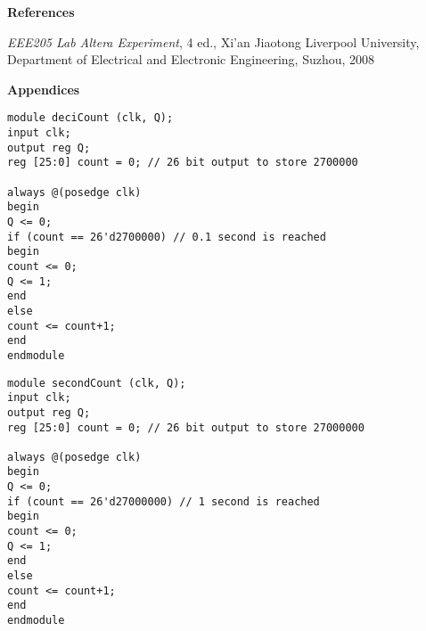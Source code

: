 \documentclass[12pt,a4paper]{article}
\begin{document}
	\vspace{0.2cm}
	\noindent \textbf{\Large References}
	\vspace{0.2cm}
	
	\noindent [1] \textit{EEE205 Lab Altera Experiment}, 4 ed., Xi’an Jiaotong Liverpool University, Department of Electrical and Electronic Engineering, Suzhou, 2008
	
	\vspace{0.2cm}
	\vfill
\vspace{10cm}
	
	\noindent \textbf{\Large Appendices}
	\vspace{0.2cm}
	
	\begin{lstlisting}[style={verilog-style},caption={Verilog code for Decisecond counter},captionpos=b]
module deciCount (clk, Q);
input clk;
output reg Q;
reg [25:0] count = 0; // 26 bit output to store 2700000

always @(posedge clk)
begin
Q <= 0;
if (count == 26'd2700000) // 0.1 second is reached
begin
count <= 0;
Q <= 1;
end
else
count <= count+1;
end
endmodule
	\end{lstlisting}
	
	\begin{lstlisting}[style={verilog-style},caption={Verilog code for second counter},captionpos=b]
module secondCount (clk, Q);
input clk;
output reg Q;
reg [25:0] count = 0; // 26 bit output to store 27000000

always @(posedge clk)
begin
Q <= 0;
if (count == 26'd27000000) // 1 second is reached
begin
count <= 0;
Q <= 1;
end
else
count <= count+1;
end
endmodule
	\end{lstlisting}
	
\end{document}
